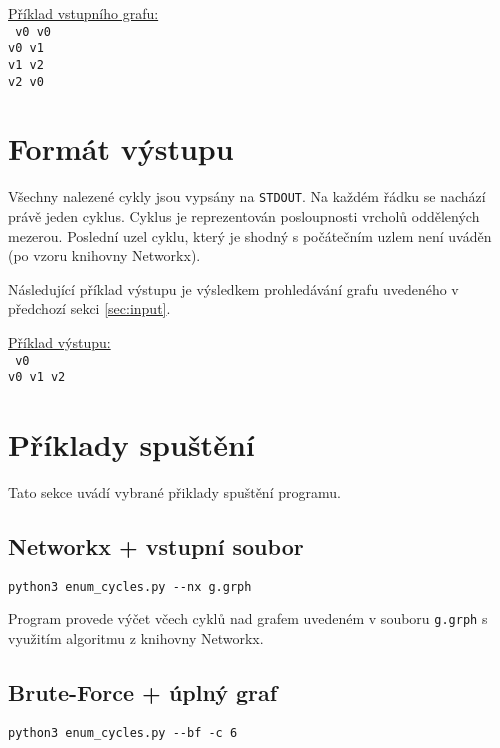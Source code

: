         \vspace*{1em}
        \noindent \underline{Příklad vstupního grafu:}
        \vspace*{0.5em}\\
        \noindent\texttt{
            v0 v0\\
            v0 v1\\
            v1 v2\\
            v2 v0
        }

    \section{Formát výstupu}
        Všechny nalezené cykly jsou vypsány na \texttt{STDOUT}. Na každém řádku se nachází právě jeden cyklus. Cyklus je reprezentován posloupnosti vrcholů oddělených mezerou. Poslední uzel cyklu, který je shodný s počátečním uzlem není uváděn (po vzoru knihovny Networkx).

        Následující příklad výstupu je výsledkem prohledávání grafu uvedeného v předchozí sekci \ref{sec:input}.

        \vspace*{1em}
        \noindent \underline{Příklad výstupu:}
        \vspace*{0.5em}\\
        \noindent\texttt{
            v0\\
            v0 v1 v2
        }

    \section{Příklady spuštění}
        Tato sekce uvádí vybrané přiklady spuštění programu.

        \subsection*{Networkx + vstupní soubor}
            \texttt{python3 enum\_cycles.py -{}-nx g.grph}

            \vspace*{0.5em}
            Program provede výčet včech cyklů nad grafem uvedeném v souboru \texttt{g.grph} s využitím algoritmu z knihovny Networkx.

        \subsection*{Brute-Force + úplný graf}
            \texttt{python3 enum\_cycles.py -{}-bf -c 6}

